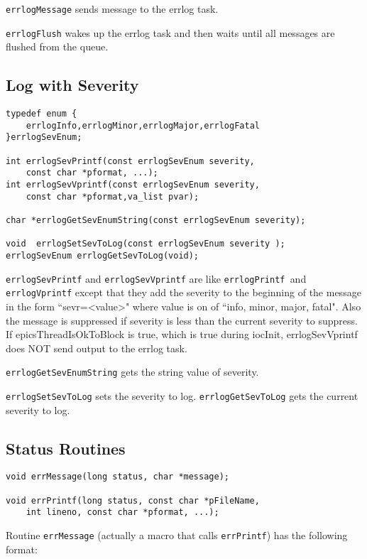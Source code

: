 \verb|errlogMessage| sends message to the errlog task.

\verb|errlogFlush| wakes up the errlog task and then waits until all messages are flushed from the queue.

\subsection{Log with Severity}

\begin{verbatim}
typedef enum {
    errlogInfo,errlogMinor,errlogMajor,errlogFatal
}errlogSevEnum;

int errlogSevPrintf(const errlogSevEnum severity,
    const char *pformat, ...);
int errlogSevVprintf(const errlogSevEnum severity,
    const char *pformat,va_list pvar);

char *errlogGetSevEnumString(const errlogSevEnum severity);

void  errlogSetSevToLog(const errlogSevEnum severity );
errlogSevEnum errlogGetSevToLog(void);
\end{verbatim}
\verb|errlogSevPrintf| and \verb|errlogSevVprintf| are like \verb|errlogPrintf |and  \verb|errlogVprintf| except that they 
add the severity to the beginning of the message in the form ``sevr=\textless{}value\textgreater{}" where value is on of ``info, minor, major, 
fatal". Also the message is suppressed if  severity is less than the current severity to suppress. If epicsThreadIsOkToBlock 
is true, which is true during iocInit, errlogSevVprintf does NOT send output to the errlog task.

\verb|errlogGetSevEnumString| gets the string value of severity. 

 \verb|errlogSetSevToLog| sets the severity to log. \verb|errlogGetSevToLog| gets the current severity to log.

\subsection{Status Routines }

\begin{verbatim}
void errMessage(long status, char *message);

void errPrintf(long status, const char *pFileName,
    int lineno, const char *pformat, ...);
\end{verbatim}
Routine \verb|errMessage| (actually a macro that calls \verb|errPrintf|) has the following format:

